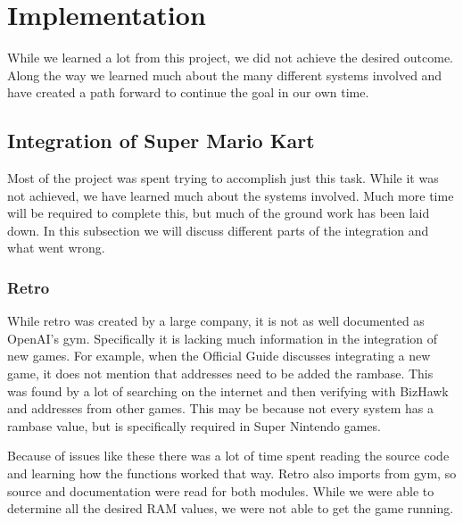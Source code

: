 \section{Implementation}
While we learned a lot from this project, we did not achieve the desired outcome.
Along the way we learned much about the many different systems involved and 
have created a path forward to continue the goal in our own time. 

\subsection{Integration of Super Mario Kart}
Most of the project was spent trying to accomplish just this task. While it was
not achieved, we have learned much about the systems involved. Much more time 
will be required to complete this, but much of the ground work has been laid 
down. In this subsection we will discuss different parts of the integration
and what went wrong.

\subsubsection{Retro}
While retro was created by a large company, it is not as well documented as
OpenAI's gym. Specifically it is lacking much information in the integration
of new games. For example, when the 
Official Guide discusses integrating a new game, it does not mention that
addresses need to be added the rambase. This was found by a lot of searching
on the internet and then verifying with BizHawk and addresses from other games. 
This may be because not every system has a rambase value, but is specifically
required in Super Nintendo games.

Because of issues like these there was a lot of time spent reading the source
code and learning how the functions worked that way. Retro also imports from
gym, so source and documentation were read for both modules. While we were able
to determine all the desired RAM values, we were not able to get the game running.

